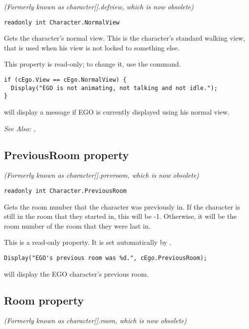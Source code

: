 \it{(Formerly known as character[].defview, which is now obsolete)}

\begin{verbatim}
readonly int Character.NormalView
\end{verbatim}
Gets the character's normal view. This is the character's standard walking view, that
is used when his view is not locked to something else.

This property is read-only; to change it, use the  command.

\begin{verbatim}
if (cEgo.View == cEgo.NormalView) {
  Display("EGO is not animating, not talking and not idle.");
}
\end{verbatim}
will display a message if EGO is currently displayed using his normal view.

\it{See Also:} ,


\subsection{PreviousRoom property}\label{Character.PreviousRoom}%

\it{(Formerly known as character[].prevroom, which is now obsolete)}

\begin{verbatim}
readonly int Character.PreviousRoom
\end{verbatim}
Gets the room number that the character was previously in. If the character is still
in the room that they started in, this will be -1. Otherwise, it will be the room number
of the room that they were last in.

This is a read-only property. It is set automatically by .

\begin{verbatim}
Display("EGO's previous room was %d.", cEgo.PreviousRoom);
\end{verbatim}
will display the EGO character's previous room.


\subsection{Room property}\label{Character.Room}%

\it{(Formerly known as character[].room, which is now obsolete)}


